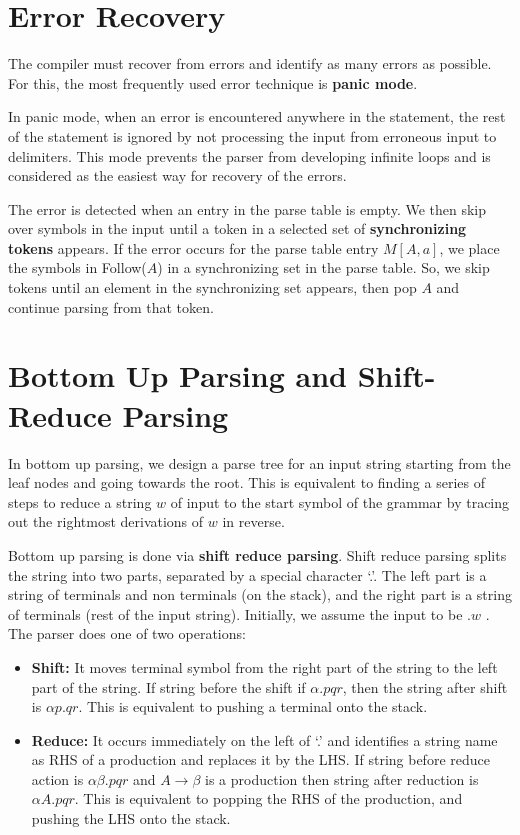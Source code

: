 \documentclass[12pt,letterpaper]{amsbook}
\theoremstyle{definition}
\begin{document}
\section{Error Recovery}

The compiler must recover from errors and identify as many errors as possible. For this, the most frequently used error technique is \textbf{panic mode}.

In panic mode, when an error is encountered anywhere in the statement, the rest of the statement is ignored by not processing the input from erroneous input to delimiters. This mode prevents the parser from developing infinite loops and is considered as the easiest way for recovery of the errors.

The error is detected when an entry in the parse table is empty. We then skip over symbols in the input until a token in a selected set of \textbf{synchronizing tokens} appears. If the error occurs for the parse table entry $M[A,a]$, we place the symbols in Follow($A$) in a synchronizing set in the parse table. So, we skip tokens until an element in the synchronizing set appears, then pop $A$ and continue parsing from that token.

\section{Bottom Up Parsing and Shift-Reduce Parsing}

In bottom up parsing, we design a parse tree for an input string starting from the leaf nodes and going towards the root. This is equivalent to finding a series of steps to reduce a string $w$ of input to the start symbol of the grammar by tracing out the rightmost derivations of $w$ in reverse.

Bottom up parsing is done via \textbf{shift reduce parsing}. Shift reduce parsing splits the string into two parts,  separated by a special character `.'. The left part is a string of terminals and non terminals (on the stack), and the right part is a string of terminals (rest of the input string). Initially, we assume the input to be $.w$ . The parser does one of two operations:

\begin{itemize}
  \item \textbf{Shift:} It moves terminal symbol from the right part of the string to the left part of the string. If string before the shift if $\alpha . pqr$, then the string after shift is $\alpha p . q r$. This is equivalent to pushing a terminal onto the stack.
  \item \textbf{Reduce:} It occurs immediately on the left of `.' and identifies a string name as RHS of a production and replaces it by the LHS. If string before reduce action is $\alpha \beta . p q r$ and $A \rightarrow \beta$ is a production then string after reduction is $\alpha A . pqr$. This is equivalent to popping the RHS of the production, and pushing the LHS onto the stack.
\end{itemize}
\end{document}
